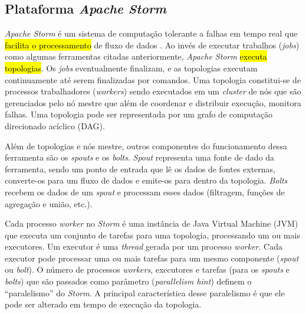 \subsection{Plataforma \emph{Apache Storm}}

\emph{Apache Storm} é um sistema de computação tolerante a falhas em tempo
real que \hl{facilita o processamento} de fluxo de dados
\cite{ApacheStorm2020,Lopez2018}.
Ao invés de executar trabalhos (\emph{jobs}) como algumas ferramentas citadas
anteriormente, \emph{Apache Storm} \hl{executa topologias}.
Os \emph{jobs} eventualmente finalizam, e as topologias executam continuamente até
serem finalizadas por comandos.
Uma topologia constitui-se de processos trabalhadores (\emph{workers}) sendo executados
em um \emph{cluster} de nós que são gerenciados pelo nó mestre que além de
coordenar e distribuir execução, monitora falhas.
Uma topologia pode ser representada por um grafo de computação direcionado
acíclico (DAG).

Além de topologias e nós mestre, outros componentes do funcionamento dessa
ferramenta são os \emph{spouts} e os \emph{bolts}.
\emph{Spout} representa uma fonte de dado da ferramenta, sendo um ponto de
entrada que lê os dados de fontes externas, converte-os para um fluxo de dados e
emite-os para dentro da topologia.
\emph{Bolts} recebem os dados de um \emph{spout} e processam esses dados
(filtragem, funções de agregação e união, etc.).

Cada processo \emph{worker} no \emph{Storm} é uma instância de Java Virtual Machine (JVM)
que executa um conjunto de tarefas para uma topologia, processando um ou mais
executores.
Um executor é uma \emph{thread} gerada por um processo \emph{worker}.
Cada executor pode processar uma ou mais tarefas para um mesmo componente
(\emph{spout} ou \emph{bolt}).
O número de processos \emph{workers}, executores e tarefas (para os
\emph{spouts} e \emph{bolts}) que são passados como parâmetro (\emph{parallelism
hint}) definem o ``paralelismo'' do \emph{Storm}. A principal característica desse
paralelismo é que ele pode ser alterado em tempo de execução da topologia.



